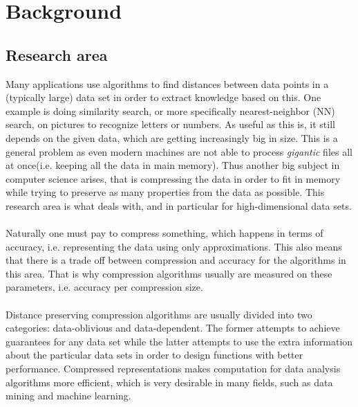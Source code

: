 \section{Background}
\label{background}

\subsection{Research area}
\label{research_area}
Many applications use algorithms to find distances between data points in a (typically large) data set in order to extract knowledge based on this. 
One example is doing similarity search, or more specifically nearest-neighbor (NN) search, on pictures to recognize letters or numbers. As useful as this is, it still depends on the given data, which are getting increasingly big in size. This is a general problem as even modern machines are not able to process \textit{gigantic} files all at once(i.e. keeping all the data in main memory). Thus another big subject in computer science arises, that is compressing the data in order to fit in memory while trying to preserve as many properties from the data as possible. This research area is what \qs{} deals with, and in particular for high-dimensional data sets.
\\
\\
Naturally one must pay to compress something, which happens in terms of accuracy, i.e. representing the data using only approximations. This also means that there is a trade off between compression and accuracy for the algorithms in this area. That is why compression algorithms usually are measured on these parameters, i.e. accuracy per compression size.
\\
\\
Distance preserving compression algorithms are usually divided into two categories: data-oblivious and data-dependent. The former attempts to achieve guarantees for any data set while the latter attempts to use the extra information about the particular data sets in order to design functions with better performance. Compressed representations makes computation for data analysis algorithms more efficient, which is very desirable in many fields, such as data mining and machine learning.\cite{stan15}

